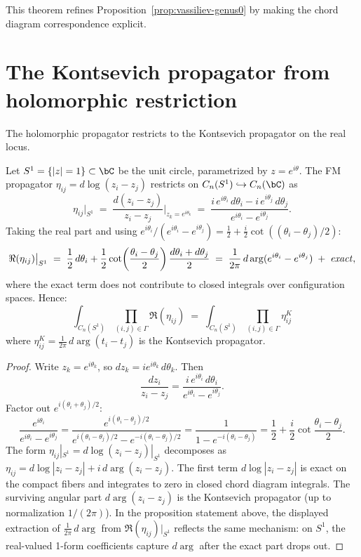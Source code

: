 This theorem refines Proposition~\ref{prop:vassiliev-genus0} by
making the chord diagram correspondence explicit.

\section{The Kontsevich propagator from holomorphic restriction}
\label{sec:kontsevich-propagator}

The holomorphic propagator restricts to the Kontsevich propagator on the real locus.

\begin{proposition}
\label{prop:propagator-restriction}
Let $S^1 = \{|z| = 1\} \subset \bC$ be the unit circle, parametrized
by $z = e^{i\theta}$. The FM propagator $\eta_{ij} = d\log(z_i-z_j)$
restricts on $C_n(S^1) \hookrightarrow C_n(\bC)$ as
\[
\eta_{ij}\big|_{S^1}
\;=\;
\frac{d(z_i - z_j)}{z_i - z_j}\bigg|_{z_k = e^{i\theta_k}}
\;=\;
\frac{i\, e^{i\theta_i}\, d\theta_i - i\, e^{i\theta_j}\, d\theta_j}
 {e^{i\theta_i} - e^{i\theta_j}}.
\]
Taking the real part and using
$e^{i\theta_i}/(e^{i\theta_i}-e^{i\theta_j})
= \tfrac{1}{2} + \tfrac{i}{2}\cot((\theta_i-\theta_j)/2)$:
\[
\Re(\eta_{ij})\big|_{S^1}
\;=\;
\frac{1}{2}\, d\theta_i
+ \frac{1}{2}\cot\!\left(\frac{\theta_i-\theta_j}{2}\right)
 \frac{d\theta_i + d\theta_j}{2}
\;=\;
\frac{1}{2\pi}\, d\arg(e^{i\theta_i} - e^{i\theta_j})
\;+\; \text{\emph{exact}},
\]
where the exact term does not contribute to closed integrals
over configuration spaces. Hence:
\[
\int_{C_n(S^1)} \prod_{(i,j) \in \Gamma}
\Re(\eta_{ij})
\;=\;
\int_{C_n(S^1)} \prod_{(i,j) \in \Gamma}
\eta^K_{ij}
\]
where $\eta^K_{ij} = \frac{1}{2\pi}\, d\arg(t_i - t_j)$ is
the Kontsevich propagator.
\end{proposition}

\begin{proof}
Write $z_k = e^{i\theta_k}$, so $dz_k = ie^{i\theta_k}\, d\theta_k$.
Then
\[
\frac{dz_i}{z_i - z_j}
= \frac{i\, e^{i\theta_i}\, d\theta_i}
 {e^{i\theta_i} - e^{i\theta_j}}.
\]
Factor out $e^{i(\theta_i+\theta_j)/2}$:
\[
\frac{e^{i\theta_i}}{e^{i\theta_i}-e^{i\theta_j}}
= \frac{e^{i(\theta_i-\theta_j)/2}}
 {e^{i(\theta_i-\theta_j)/2} - e^{-i(\theta_i-\theta_j)/2}}
= \frac{1}{1 - e^{-i(\theta_i-\theta_j)}}
= \frac{1}{2} + \frac{i}{2}\cot\!\frac{\theta_i-\theta_j}{2}.
\]
The form $\eta_{ij}|_{S^1} = d\log(z_i-z_j)|_{S^1}$
decomposes as
$\eta_{ij} = d\log|z_i-z_j| + i\,d\arg(z_i-z_j)$.
The first term $d\log|z_i-z_j|$ is exact on the compact
fibers and integrates to zero in closed chord diagram integrals.
The surviving angular part $d\arg(z_i-z_j)$ is the Kontsevich
propagator (up to normalization $1/(2\pi)$).
In the proposition statement above, the displayed extraction
of $\frac{1}{2\pi}\,d\arg$ from $\Re(\eta_{ij})|_{S^1}$
reflects the same mechanism: on $S^1$, the real-valued 1-form
coefficients capture $d\arg$ after the exact part drops out.
\end{proof}

